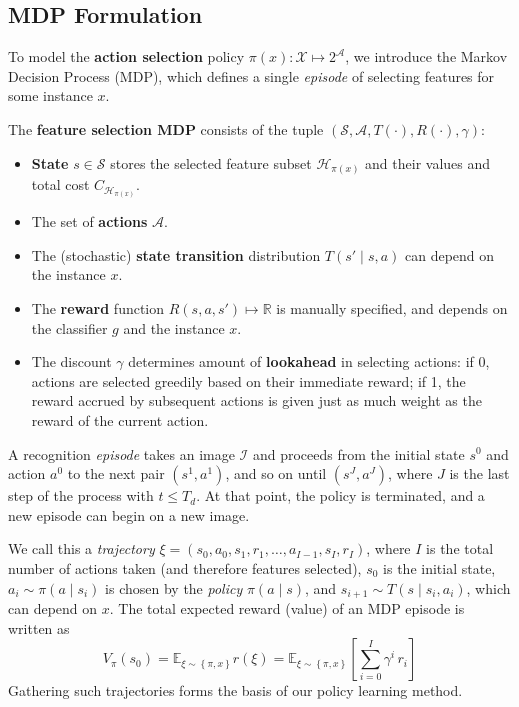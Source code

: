 \subsection{MDP Formulation}\label{sec:mdp_formulation}

To model the \textbf{action selection} policy $\pi(x): \mathcal{X} \mapsto 2^\mathcal{A}$, we introduce the Markov Decision Process (MDP), which defines a single \emph{episode} of selecting features for some instance $x$.

\begin{mydef} \label{def:MDP}
The \textbf{feature selection MDP} consists of the tuple $(\mathcal{S}, \mathcal{A}, T(\cdot), R(\cdot), \gamma)$:

\begin{itemize}
\item \textbf{State} $s \in \mathcal{S}$ stores the selected feature subset $\mathcal{H}_{\pi(x)}$ and their values and total cost $C_{\mathcal{H}_{\pi(x)}}$.
\item The set of \textbf{actions} $\mathcal{A}$.
\item The (stochastic) \textbf{state transition} distribution $T(s' \mid s, a)$ can depend on the instance $x$.
\item The \textbf{reward} function $R(s, a, s') \mapsto \mathbb{R}$ is manually specified, and depends on the classifier $g$ and the instance $x$.
\item The discount $\gamma$ determines amount of \textbf{lookahead} in selecting actions: if 0, actions are selected greedily based on their immediate reward; if 1, the reward accrued by subsequent actions is given just as much weight as the reward of the current action.
\end{itemize}
\end{mydef}

A recognition \emph{episode} takes an image $\mathcal{I}$ and proceeds from the initial state $s^0$ and action $a^0$ to the next pair $(s^1,a^1)$, and so on until $(s^J,a^J)$, where $J$ is the last step of the process with $t \le T_d$.
At that point, the policy is terminated, and a new episode can begin on a new image.

We call this a \emph{trajectory} $\xi = (s_0, a_0, s_1, r_1, \dots, a_{I-1}, s_I, r_I)$, where $I$ is the total number of actions taken (and therefore features selected), $s_0$ is the initial state, $a_i \sim \pi(a \mid s_i)$ is chosen by the \emph{policy} $\pi(a \mid s)$, and $s_{i+1} \sim T(s \mid s_i, a_i)$, which can depend on $x$.
The total expected reward (value) of an MDP episode is written as
\begin{equation} \label{eq:expected_reward}
V_\pi(s_0) =
\mathbb{E}_{\xi \sim \left\{ \pi, x \right\}} r(\xi) =
\mathbb{E}_{\xi \sim \left\{ \pi, x \right\}} \left[ \sum_{i=0}^I \gamma^i \, r_i \right]
\end{equation}
Gathering such trajectories forms the basis of our policy learning method.

